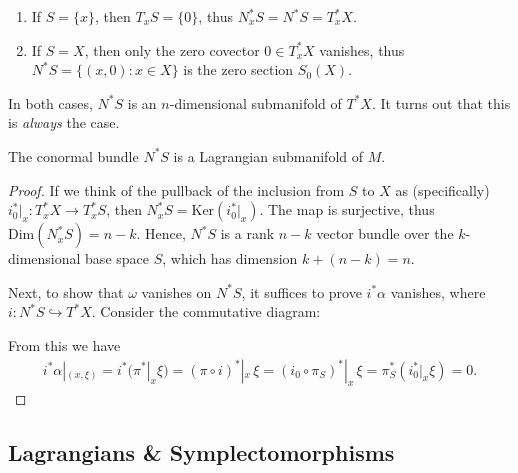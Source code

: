 \documentclass[11pt, final]{article}
\begin{document}
\begin{example}
	\begin{enumerate}[label=(\roman*)]
		\item If $S = \{x\}$, then $T_xS = \{ 0 \}$, thus $N^*_xS = N^*S = T^*_xX$.
		
		\item If $S = X$, then only the zero covector $0 \in T^*_xX$ vanishes, thus $N^*S = \{ (x,0) : x \in X \}$ is the zero section $S_0(X)$.	
	\end{enumerate}
\end{example}
\begin{remark}
In both cases, $N^*S$ is an $n$-dimensional submanifold of $T^*X$. It turns out that this is \textit{always} the case.
\end{remark}

\begin{prop}
	The conormal bundle $N^*S$ is a Lagrangian submanifold of $M$.
\end{prop}
\begin{proof}
	If we think of the pullback of the inclusion from $S$ to $X$ as (specifically) ${i_0^*|_x: T_x^*X \to T_x^*S}$, then $N^*_xS = \mathrm{Ker}(i^*_0|_x)$. The map is surjective, thus $\mathrm{Dim}(N^*_xS) = n-k$. Hence, $N^*S$ is a rank $n-k$ vector bundle over the $k$-dimensional base space $S$, which has dimension $k + (n-k) = n$.
	
	Next, to show that $\omega$ vanishes on $N^*S$, it suffices to prove $i^* \alpha$ vanishes, where $i: N^*S \hookrightarrow T^*X$. Consider the commutative diagram:
		\begin{center}
			
		\end{center}
	From this we have
		\begin{align}
			i^*\alpha|_{(x,\xi)} = i^* ( \pi^*|_x \xi ) = (\pi \circ i)^*|_x \, \xi = (i_0 \circ \pi_S )^*|_x \, \xi = \pi_S^* ( i_0^*|_x \xi) = 0.
		\end{align}
\end{proof}

\subsection{Lagrangians \& Symplectomorphisms}
\end{document}
